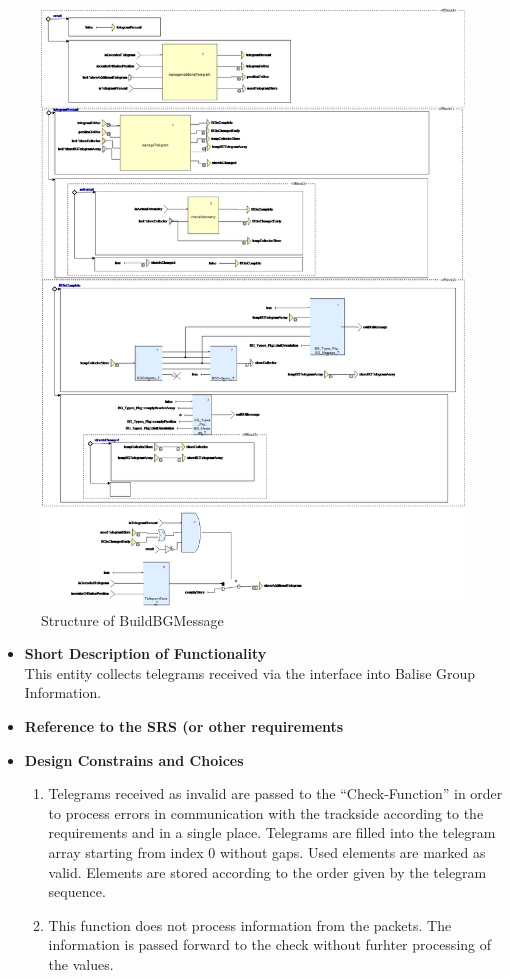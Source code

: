 \documentclass{template/openetcs_article}
\begin{document}
\begin{figure}[hbtp]
\centering
\includegraphics[scale=0.5]{../images/BuildBGMessage_diagram.png}
\caption{Structure of BuildBGMessage}
\end{figure}

\begin{itemize}
	\item \textbf{Short Description of Functionality}\\
	This entity collects telegrams received via the interface into Balise Group Information.
	\item \textbf{Reference to the SRS (or other requirements}\\
	\item \textbf{Design Constrains and Choices}\\
	\begin{enumerate}
		\item Telegrams received as invalid are passed to the ``Check-Function'' in order to process errors in communication with the trackside according to the requirements and in a single place.
		Telegrams are filled into the telegram array starting from index 0 without gaps. Used elements are marked as valid. Elements are stored according to the order given by the telegram sequence.
\item This function does not process information from the packets. The information is passed forward to the check without furhter processing of the values. 
	\end{enumerate}
\end{itemize}
\end{document}
